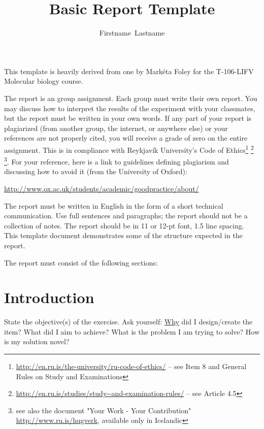 \documentclass[svn, draft]{rureport}
\author{Firstname~Lastname\formatemail{email11}}  %
\title{Basic Report Template}  %
\begin{document}
\maketitle  %
\listoffixmes{}
This template is heavily derived from one by Markéta Foley for the
T-106-LIFV Molecular biology course.

The report is an group assignment. Each group must write their own
report. You may discuss how to interpret the results of the experiment
with your classmates, but the report must be written in your own
words. If any part of your report is plagiarized (from another group,
the internet, or anywhere else) or your references are not properly
cited, you will receive a grade of zero on the entire assignment. This
is in compliance with Reykjav\'ik University's Code of
Ethics\footnote{\url{http://en.ru.is/the-university/ru-code-of-ethics/}
  -- see Item 8 and General Rules on Study and Examinations}
\footnote{\url{http://en.ru.is/studies/study--and-examination-rules/}
  -- see Article 4.5} \footnote{see also the document "Your Work -
  Your Contribution" \url{http://www.ru.is/hugverk}, available only in
  Icelandic}. For your reference, here is a link to guidelines
defining plagiarism and discussing how to avoid it (from the
University of Oxford):

\url{http://www.ox.ac.uk/students/academic/goodpractice/about/}

The report must be written in English in the form of a short technical
communication. Use full sentences and paragraphs; the report should
not be a collection of notes. The report should be in 11 or 12-pt
font, 1.5 line spacing.  This template document demonstrates some of
the structure expected in the report.

The report must consist of the following sections:

\section{Introduction} %
State the objective(s) of the exercise. Ask yourself: \underline{Why}
did I design/create the item? What did I aim to achieve? What is the
problem I am trying to solve?  How is my solution novel?
\end{document}
